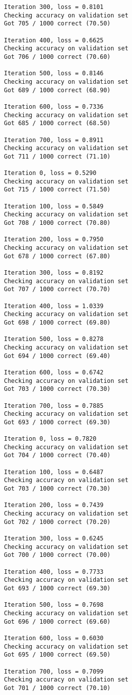 \documentclass[11pt]{article}
\begin{document}
\begin{Verbatim}[commandchars=\\\{\}]
Iteration 300, loss = 0.8101
Checking accuracy on validation set
Got 705 / 1000 correct (70.50)

Iteration 400, loss = 0.6625
Checking accuracy on validation set
Got 706 / 1000 correct (70.60)

Iteration 500, loss = 0.8146
Checking accuracy on validation set
Got 689 / 1000 correct (68.90)

Iteration 600, loss = 0.7336
Checking accuracy on validation set
Got 685 / 1000 correct (68.50)

Iteration 700, loss = 0.8911
Checking accuracy on validation set
Got 711 / 1000 correct (71.10)

Iteration 0, loss = 0.5290
Checking accuracy on validation set
Got 715 / 1000 correct (71.50)

Iteration 100, loss = 0.5849
Checking accuracy on validation set
Got 708 / 1000 correct (70.80)

Iteration 200, loss = 0.7950
Checking accuracy on validation set
Got 678 / 1000 correct (67.80)

Iteration 300, loss = 0.8192
Checking accuracy on validation set
Got 707 / 1000 correct (70.70)

Iteration 400, loss = 1.0339
Checking accuracy on validation set
Got 698 / 1000 correct (69.80)

Iteration 500, loss = 0.8278
Checking accuracy on validation set
Got 694 / 1000 correct (69.40)

Iteration 600, loss = 0.6742
Checking accuracy on validation set
Got 703 / 1000 correct (70.30)

Iteration 700, loss = 0.7885
Checking accuracy on validation set
Got 693 / 1000 correct (69.30)

Iteration 0, loss = 0.7820
Checking accuracy on validation set
Got 704 / 1000 correct (70.40)

Iteration 100, loss = 0.6487
Checking accuracy on validation set
Got 703 / 1000 correct (70.30)

Iteration 200, loss = 0.7439
Checking accuracy on validation set
Got 702 / 1000 correct (70.20)

Iteration 300, loss = 0.6245
Checking accuracy on validation set
Got 700 / 1000 correct (70.00)

Iteration 400, loss = 0.7733
Checking accuracy on validation set
Got 693 / 1000 correct (69.30)

Iteration 500, loss = 0.7698
Checking accuracy on validation set
Got 696 / 1000 correct (69.60)

Iteration 600, loss = 0.6030
Checking accuracy on validation set
Got 695 / 1000 correct (69.50)

Iteration 700, loss = 0.7099
Checking accuracy on validation set
Got 701 / 1000 correct (70.10)


    \end{Verbatim}
\end{document}
